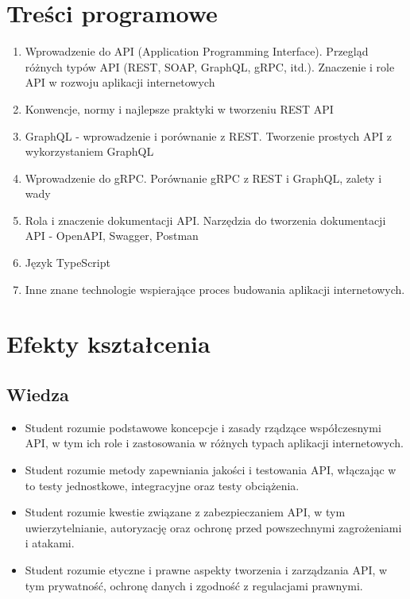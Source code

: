 \documentclass[12pt, a4paper]{article}
\begin{document}
\section{Treści programowe}

\begin{enumerate}
  \item Wprowadzenie do API (Application Programming Interface). Przegląd różnych typów API (REST, SOAP, GraphQL, gRPC, itd.). Znaczenie i role API w rozwoju aplikacji internetowych
  \item Konwencje, normy i najlepsze praktyki w tworzeniu REST API
  \item GraphQL - wprowadzenie i porównanie z REST. Tworzenie prostych API z wykorzystaniem GraphQL
  \item Wprowadzenie do gRPC. Porównanie gRPC z REST i GraphQL, zalety i wady
  \item Rola i znaczenie dokumentacji API. Narzędzia do tworzenia dokumentacji API - OpenAPI, Swagger, Postman
  \item Język TypeScript
  \item Inne znane technologie wspierające proces budowania aplikacji internetowych.
\end{enumerate}

\section{Efekty kształcenia}

\subsection*{Wiedza}
\begin{itemize}
  \item Student rozumie podstawowe koncepcje i zasady rządzące współczesnymi API, w tym ich role i zastosowania w różnych typach aplikacji internetowych.
  \item Student rozumie metody zapewniania jakości i testowania API, włączając w to testy jednostkowe, integracyjne oraz testy obciążenia.
  \item Student rozumie kwestie związane z zabezpieczaniem API, w tym uwierzytelnianie, autoryzację oraz ochronę przed powszechnymi zagrożeniami i atakami.
  \item Student rozumie etyczne i prawne aspekty tworzenia i zarządzania API, w tym prywatność, ochronę danych i zgodność z regulacjami prawnymi.
\end{itemize}
\end{document}
